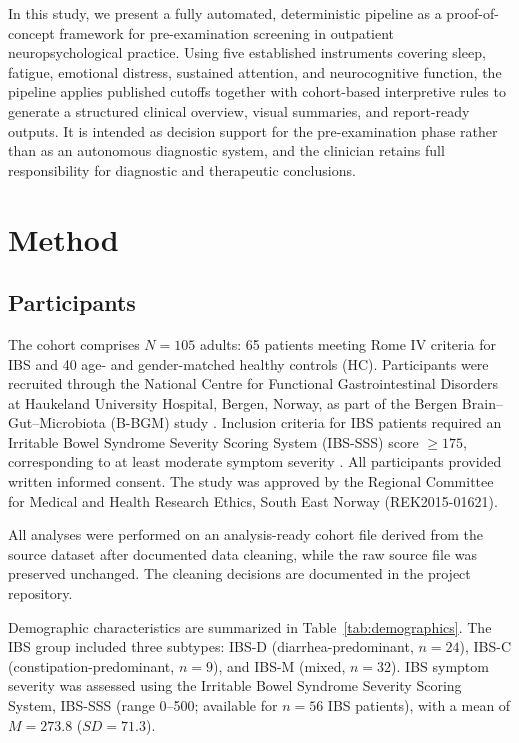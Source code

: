 \documentclass[11pt,a4paper]{article}
\begin{document}
In this study, we present a fully automated, deterministic pipeline as a proof-of-concept framework for pre-examination screening in outpatient neuropsychological practice. Using five established instruments covering sleep, fatigue, emotional distress, sustained attention, and neurocognitive function, the pipeline applies published cutoffs together with cohort-based interpretive rules to generate a structured clinical overview, visual summaries, and report-ready outputs. It is intended as decision support for the pre-examination phase rather than as an autonomous diagnostic system, and the clinician retains full responsibility for diagnostic and therapeutic conclusions.

\section{Method}
\label{sec:methods}

\subsection{Participants}

The cohort comprises $N = 105$ adults: 65 patients meeting Rome IV criteria for IBS and 40 age- and gender-matched healthy controls (HC). Participants were recruited through the National Centre for Functional Gastrointestinal Disorders at Haukeland University Hospital, Bergen, Norway, as part of the Bergen Brain--Gut--Microbiota (B-BGM) study \citep{Berentsen2020}. Inclusion criteria for IBS patients required an Irritable Bowel Syndrome Severity Scoring System (IBS-SSS) score $\geq 175$, corresponding to at least moderate symptom severity \citep{Francis1997IBSSSS}. All participants provided written informed consent. The study was approved by the Regional Committee for Medical and Health Research Ethics, South East Norway (REK2015-01621).

All analyses were performed on an analysis-ready cohort file derived from the source dataset after documented data cleaning, while the raw source file was preserved unchanged. The cleaning decisions are documented in the project repository.

Demographic characteristics are summarized in Table~\ref{tab:demographics}. The IBS group included three subtypes: IBS-D (diarrhea-predominant, $n = 24$), IBS-C (constipation-predominant, $n = 9$), and IBS-M (mixed, $n = 32$). 
IBS symptom severity was assessed using the Irritable Bowel Syndrome Severity Scoring System, IBS-SSS (range 0--500; available for $n = 56$ IBS patients), with a mean of $M = 273.8$ ($SD = 71.3$).
\end{document}
